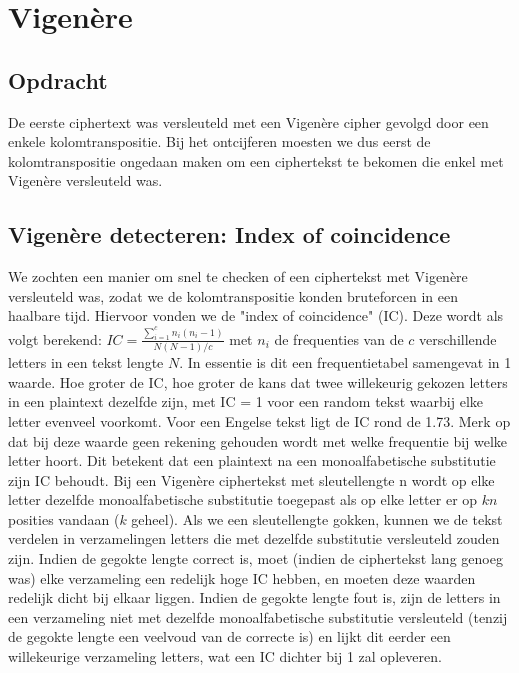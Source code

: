 
\section{Vigen\`ere}
\subsection{Opdracht}
De eerste ciphertext was versleuteld met een Vigen\`ere cipher gevolgd door een enkele kolomtranspositie. Bij het ontcijferen moesten we dus eerst de kolomtranspositie ongedaan maken om een ciphertekst te bekomen die enkel met Vigen\`ere versleuteld was. 

\subsection{Vigen\`ere detecteren: Index of coincidence}
We zochten een manier om snel te checken of een ciphertekst met Vigen\`ere versleuteld was, zodat we de kolomtranspositie konden bruteforcen in een haalbare tijd. Hiervoor vonden we de "index of coincidence" (IC). Deze wordt als volgt berekend: $IC = \frac{\sum_{i=1}^{c}n_i(n_i -1)}{N(N-1)/c}$ met $n_i$ de frequenties van de $c$ verschillende letters in een tekst lengte $N$. In essentie is dit een frequentietabel samengevat in 1 waarde. Hoe groter de IC, hoe groter de kans dat twee willekeurig gekozen letters in een plaintext dezelfde zijn, met IC = 1 voor een random tekst waarbij elke letter evenveel voorkomt. Voor een Engelse tekst ligt de IC rond de 1.73. Merk op dat bij deze waarde geen rekening gehouden wordt met welke frequentie bij welke letter hoort. Dit betekent dat een plaintext na een monoalfabetische substitutie zijn IC behoudt. Bij een Vigen\`ere ciphertekst met sleutellengte n wordt op elke letter dezelfde monoalfabetische substitutie toegepast als op elke letter er op $kn$ posities vandaan ($k$ geheel). Als we een sleutellengte gokken, kunnen we de tekst verdelen in verzamelingen letters die met dezelfde substitutie versleuteld zouden zijn. Indien de gegokte lengte correct is, moet (indien de ciphertekst lang genoeg was) elke verzameling een redelijk hoge IC hebben, en moeten deze waarden redelijk dicht bij elkaar liggen. Indien de gegokte lengte fout is, zijn de letters in een verzameling niet met dezelfde monoalfabetische substitutie versleuteld (tenzij de gegokte lengte een veelvoud van de correcte is) en lijkt dit eerder een willekeurige verzameling letters, wat een IC dichter bij 1 zal opleveren. \\

